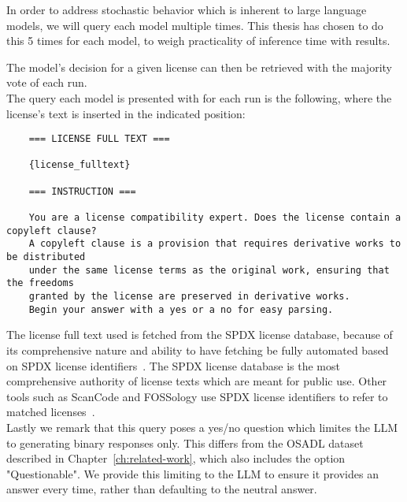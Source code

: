 In order to address stochastic behavior which is inherent to large language models, we will query each model multiple times. This thesis has chosen to do this 5 times for each model, to weigh practicality of inference time with results.

The model's decision for a given license can then be retrieved with the majority vote of each run. \\

The query each model is presented with for each run is the following, where the license's text is inserted in the indicated position:

\begin{verbatim}
	=== LICENSE FULL TEXT ===
	
	{license_fulltext}
	
	=== INSTRUCTION ===
	
	You are a license compatibility expert. Does the license contain a copyleft clause?
	A copyleft clause is a provision that requires derivative works to be distributed
	under the same license terms as the original work, ensuring that the freedoms
	granted by the license are preserved in derivative works.
	Begin your answer with a yes or a no for easy parsing.
\end{verbatim}

The license full text used is fetched from the SPDX license database, because of its comprehensive nature and ability to have fetching be fully automated based on SPDX license identifiers~\cite{spdx-licenses}. The SPDX license database is the most comprehensive authority of license texts which are meant for public use. Other tools such as ScanCode and FOSSology use SPDX license identifiers to refer to matched licenses~\cite{scancode-home}\cite{fossology-home}. \\

Lastly we remark that this query poses a yes/no question which limites the LLM to generating binary responses only. This differs from the OSADL dataset described in Chapter~\ref{ch:related-work}, which also includes the option "Questionable". We provide this limiting to the LLM to ensure it provides an answer every time, rather than defaulting to the neutral answer.